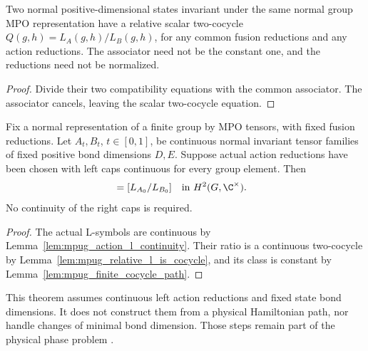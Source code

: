 \begin{lemma}
    \label{lem:mpug_relative_l_is_cocycle}
    \leanok
    Two normal positive-dimensional states invariant under the same normal
    group MPO representation have a relative scalar two-cocycle
    $Q(g,h)=L_A(g,h)/L_B(g,h)$, for any common fusion reductions and any
    action reductions. The associator need not be the constant one, and
    the reductions need not be normalized.
\end{lemma}
\begin{proof}\leanok
    Divide their two compatibility equations with the common associator.
    The associator cancels, leaving the scalar two-cocycle equation.
\end{proof}

\begin{lemma}
    \label{lem:mpug_continuous_reduction_path_class}
    \leanok
    Fix a normal representation of a finite group by MPO tensors, with
    fixed fusion reductions. Let $A_t,B_t$, $t\in[0,1]$, be continuous
    normal invariant tensor families of fixed positive bond dimensions
    $D,E$. Suppose actual action reductions have been chosen with left
    caps continuous for every group element. Then
    \begin{align}
        [L_{A_1}/L_{B_1}] & =[L_{A_0}/L_{B_0}]
        \quad\hbox{in }H^2(G,\C^\times).
    \end{align}
    No continuity of the right caps is required.
\end{lemma}
\begin{proof}\leanok
    The actual L-symbols are continuous by
    Lemma~\ref{lem:mpug_action_l_continuity}. Their ratio is a continuous
    two-cocycle by Lemma~\ref{lem:mpug_relative_l_is_cocycle}, and its
    class is constant by Lemma~\ref{lem:mpug_finite_cocycle_path}.
\end{proof}

This theorem assumes continuous left action reductions and fixed state
bond dimensions. It does not construct them from a physical Hamiltonian
path, nor handle changes of minimal bond dimension. Those steps remain
part of the physical phase problem
\cite{gap:fbc25_controlled_z_split_index_class_scope}.

